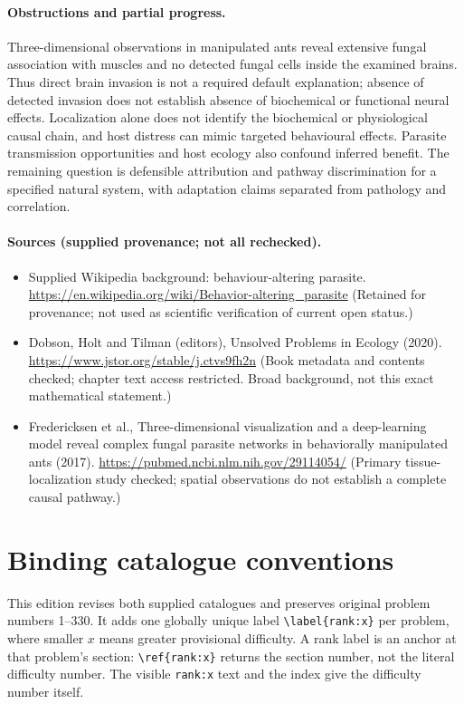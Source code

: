 \documentclass[11pt]{article}
\begin{document}
\paragraph{Obstructions and partial progress.} Three-dimensional observations in manipulated ants reveal extensive fungal association with muscles and no detected fungal cells inside the examined brains. Thus direct brain invasion is not a required default explanation; absence of detected invasion does not establish absence of biochemical or functional neural effects. Localization alone does not identify the biochemical or physiological causal chain, and host distress can mimic targeted behavioural effects. Parasite transmission opportunities and host ecology also confound inferred benefit. The remaining question is defensible attribution and pathway discrimination for a specified natural system, with adaptation claims separated from pathology and correlation.

\paragraph{Sources (supplied provenance; not all rechecked).} \begin{itemize}
\item Supplied Wikipedia background: behaviour-altering parasite. \url{https://en.wikipedia.org/wiki/Behavior-altering_parasite} (Retained for provenance; not used as scientific verification of current open status.)
\item Dobson, Holt and Tilman (editors), Unsolved Problems in Ecology (2020). \url{https://www.jstor.org/stable/j.ctvs9fh2n} (Book metadata and contents checked; chapter text access restricted. Broad background, not this exact mathematical statement.)
\item Fredericksen et al., Three-dimensional visualization and a deep-learning model reveal complex fungal parasite networks in behaviorally manipulated ants (2017). \url{https://pubmed.ncbi.nlm.nih.gov/29114054/} (Primary tissue-localization study checked; spatial observations do not establish a complete causal pathway.)
\end{itemize}

\section*{Binding catalogue conventions}
This edition revises both supplied catalogues and preserves original problem numbers 1--330. It adds one globally unique label \verb|\label{rank:x}| per problem, where smaller $x$ means greater provisional difficulty. A rank label is an anchor at that problem's section: \verb|\ref{rank:x}| returns the section number, not the literal difficulty number. The visible \texttt{rank:x} text and the index give the difficulty number itself.
\end{document}
